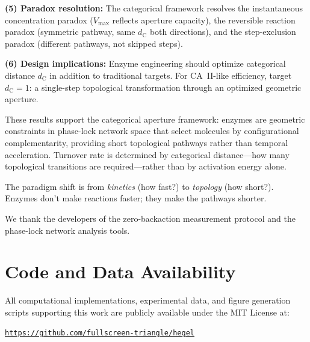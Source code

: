 \documentclass[twocolumn,amsmath,amssymb,aps,prb,superscriptaddress,longbibliography]{revtex4-2}
\newcommand{\dC}{d_{\mathrm{C}}}
\newcommand{\Vmax}{V_{\mathrm{max}}}
\begin{document}
\textbf{(5) Paradox resolution:} The categorical framework resolves the instantaneous concentration paradox ($\Vmax$ reflects aperture capacity), the reversible reaction paradox (symmetric pathway, same $\dC$ both directions), and the step-exclusion paradox (different pathways, not skipped steps).

\textbf{(6) Design implications:} Enzyme engineering should optimize categorical distance $\dC$ in addition to traditional targets. For CA~II-like efficiency, target $\dC = 1$: a single-step topological transformation through an optimized geometric aperture.

These results support the categorical aperture framework: enzymes are geometric constraints in phase-lock network space that select molecules by configurational complementarity, providing short topological pathways rather than temporal acceleration. Turnover rate is determined by categorical distance---how many topological transitions are required---rather than by activation energy alone.

The paradigm shift is from \emph{kinetics} (how fast?) to \emph{topology} (how short?). Enzymes don't make reactions faster; they make the pathways shorter.

\begin{acknowledgments}
We thank the developers of the zero-backaction measurement protocol and the phase-lock network analysis tools.
\end{acknowledgments}

\section*{Code and Data Availability}
\label{sec:code}

All computational implementations, experimental data, and figure generation 
scripts supporting this work are publicly available under the MIT License at:

\begin{center}
\Large
\href{https://github.com/fullscreen-triangle/hegel}{\texttt{https://github.com/fullscreen-triangle/hegel}}
\end{center}



\end{document}
